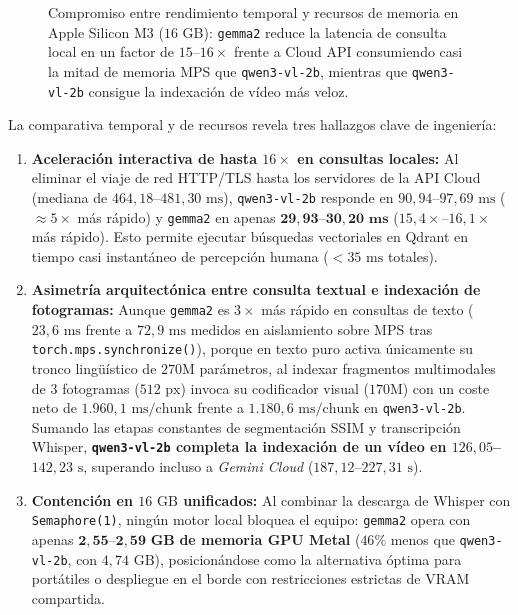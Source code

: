 \begin{figure}[htbp]
\caption{Compromiso entre rendimiento temporal y recursos de memoria en Apple Silicon M3 ($16\text{ GB}$): \texttt{gemma2} reduce la latencia de consulta local en un factor de $15$--$16\times$ frente a Cloud API consumiendo casi la mitad de memoria MPS que \texttt{qwen3-vl-2b}, mientras que \texttt{qwen3-vl-2b} consigue la indexación de vídeo más veloz.}
\label{fig:backends_tradeoff_latencia_memoria}
\end{figure}

La comparativa temporal y de recursos revela tres hallazgos clave de ingeniería:
\begin{enumerate}
    \item \textbf{Aceleración interactiva de hasta $16\times$ en consultas locales:} Al eliminar el viaje de red HTTP/TLS hasta los servidores de la API Cloud (mediana de $464,18$--$481,30\text{ ms}$), \texttt{qwen3-vl-2b} responde en $90,94$--$97,69\text{ ms}$ ($\approx 5\times$ más rápido) y \texttt{gemma2} en apenas $\mathbf{29,93}$--$\mathbf{30,20\text{ ms}}$ ($15,4\times$--$16,1\times$ más rápido). Esto permite ejecutar búsquedas vectoriales en Qdrant en tiempo casi instantáneo de percepción humana ($< 35\text{ ms}$ totales).
    \item \textbf{Asimetría arquitectónica entre consulta textual e indexación de fotogramas:} Aunque \texttt{gemma2} es $3\times$ más rápido en consultas de texto ($23,6\text{ ms}$ frente a $72,9\text{ ms}$ medidos en aislamiento sobre MPS tras \texttt{torch.mps.synchronize()}), porque en texto puro activa únicamente su tronco lingüístico de $270\text{M}$ parámetros, al indexar fragmentos multimodales de $3$ fotogramas ($512\text{ px}$) invoca su codificador visual ($170\text{M}$) con un coste neto de $1.960,1\text{ ms/chunk}$ frente a $1.180,6\text{ ms/chunk}$ en \texttt{qwen3-vl-2b}. Sumando las etapas constantes de segmentación SSIM y transcripción Whisper, \textbf{\texttt{qwen3-vl-2b} completa la indexación de un vídeo en $126,05$--$142,23\text{ s}$}, superando incluso a \textit{Gemini Cloud} ($187,12$--$227,31\text{ s}$).
    \item \textbf{Contención en $16\text{ GB}$ unificados:} Al combinar la descarga de Whisper con \texttt{Semaphore(1)}, ningún motor local bloquea el equipo: \texttt{gemma2} opera con apenas $\mathbf{2,55\text{--}2,59\text{ GB}}$ \textbf{de memoria GPU Metal} ($46\%$ menos que \texttt{qwen3-vl-2b}, con $4,74\text{ GB}$), posicionándose como la alternativa óptima para portátiles o despliegue en el borde con restricciones estrictas de VRAM compartida.
\end{enumerate}

